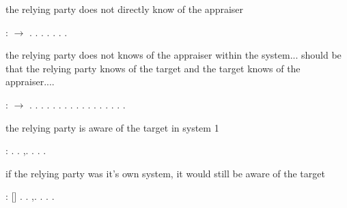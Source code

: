\documentclass[12pt]{report}
\begin{document}
the relying party does not directly know of the appraiser 
\begin{coqdoccode}
\coqdocemptyline
\coqdocnoindent
{} :     \ensuremath{\rightarrow} .\coqdoceol
\coqdocnoindent
{}.\coqdoceol
\coqdocnoindent
{} . . .  .\coqdoceol
\coqdocnoindent
{}.\coqdoceol
\coqdocemptyline
\end{coqdoccode}
the relying party does not knows of the appraiser within the system... 
   should be that the relying party knows of the target and the target knows of the appraiser....  
\begin{coqdoccode}
\coqdocemptyline
\coqdocnoindent
{} :     \ensuremath{\rightarrow} .\coqdoceol
\coqdocnoindent
{}.\coqdoceol
\coqdocnoindent
{} . .  . . .  .  .  .  .  .  .  .  .  .\coqdoceol
\coqdocnoindent
{}.\coqdoceol
\coqdocemptyline
\end{coqdoccode}
the relying party is aware of the target in system 1
\begin{coqdoccode}
\coqdocemptyline
\coqdocnoindent
{} :    .\coqdoceol
\coqdocnoindent
{}.\coqdoceol
\coqdocnoindent
{} ,. . .\coqdoceol
\coqdocnoindent
{}.\coqdoceol
\coqdocemptyline
\end{coqdoccode}
if the relying party was it's own system, it would still be aware of the target 
\begin{coqdoccode}
\coqdocemptyline
\coqdocnoindent
{} :   [] .\coqdoceol
\coqdocnoindent
{}.\coqdoceol
\coqdocnoindent
{} ,. . .\coqdoceol
\coqdocnoindent
{}.\coqdoceol
\coqdocemptyline
\end{coqdoccode}
\end{document}
